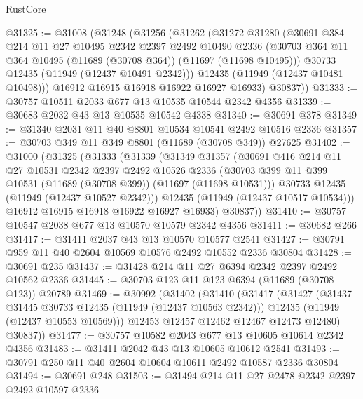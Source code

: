 \begin{lexlean}{RustCore}
\begin{coremodule}
@31325 := @31008
    (@31248
      (@31256
        (@31262
          (@31272
            @31280
            (@30691
              @384
              @214
              @11
              @27
              @10495
              @2342
              @2397
              @2492
              @10490
              @2336
              (@30703 @364 @11 @364 @10495 (@11689 (@30708 @364)) (@11697 (@11698 @10495)))
              @30733
              @12435
              (@11949 (@12437 @10491 @2342)))
            @12435
            (@11949 (@12437 @10481 @10498)))
          @16912
          @16915
          @16918
          @16922
          @16927
          @16933)
        @30837))
@31333 := @30757 @10511 @2033 @677 @13 @10535 @10544 @2342 @4356
@31339 := @30683 @2032 @43 @13 @10535 @10542 @4338
@31340 := @30691 @378
@31349 := @31340 @2031 @11 @40 @8801 @10534 @10541 @2492 @10516 @2336
@31357 := @30703 @349 @11 @349 @8801 (@11689 (@30708 @349)) @27625
@31402 := @31000
    (@31325
      (@31333
        (@31339
          (@31349
            @31357
            (@30691
              @416
              @214
              @11
              @27
              @10531
              @2342
              @2397
              @2492
              @10526
              @2336
              (@30703 @399 @11 @399 @10531 (@11689 (@30708 @399)) (@11697 (@11698 @10531)))
              @30733
              @12435
              (@11949 (@12437 @10527 @2342)))
            @12435
            (@11949 (@12437 @10517 @10534)))
          @16912
          @16915
          @16918
          @16922
          @16927
          @16933)
        @30837))
@31410 := @30757 @10547 @2038 @677 @13 @10570 @10579 @2342 @4356
@31411 := @30682 @266
@31417 := @31411 @2037 @43 @13 @10570 @10577 @2541
@31427 := @30791 @959 @11 @40 @2604 @10569 @10576 @2492 @10552 @2336 @30804
@31428 := @30691 @235
@31437 := @31428 @214 @11 @27 @6394 @2342 @2397 @2492 @10562 @2336
@31445 := @30703 @123 @11 @123 @6394 (@11689 (@30708 @123)) @20789
@31469 := @30992
    (@31402
      (@31410
        (@31417
          (@31427
            (@31437 @31445 @30733 @12435 (@11949 (@12437 @10563 @2342)))
            @12435
            (@11949 (@12437 @10553 @10569)))
          @12453
          @12457
          @12462
          @12467
          @12473
          @12480)
        @30837))
@31477 := @30757 @10582 @2043 @677 @13 @10605 @10614 @2342 @4356
@31483 := @31411 @2042 @43 @13 @10605 @10612 @2541
@31493 := @30791 @250 @11 @40 @2604 @10604 @10611 @2492 @10587 @2336 @30804
@31494 := @30691 @248
@31503 := @31494 @214 @11 @27 @2478 @2342 @2397 @2492 @10597 @2336

\end{coremodule}
\end{lexlean}
